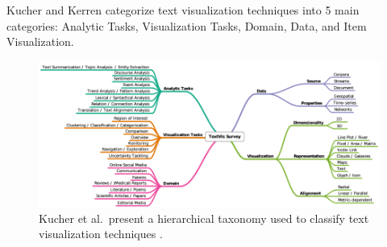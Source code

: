 Kucher and Kerren categorize text visualization techniques into 5 main categories: Analytic Tasks, Visualization Tasks, Domain, Data, and Item Visualization.


\begin{figure}[t]
\begin{center}
\includegraphics[width=1\textwidth]{images/kucher2015text}
\caption{Kucher et al.\ present a hierarchical taxonomy used to classify text visualization techniques \cite{kucher2015text}  .} \label{fig: kucher2015text}
\end{center}
\end{figure}

%
%
%


